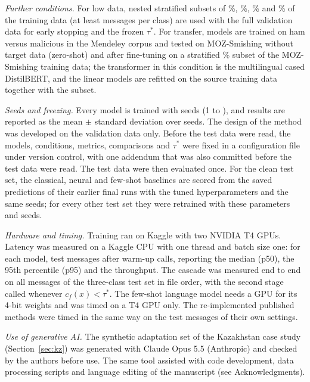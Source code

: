 \emph{Further conditions.} For low data, nested stratified subsets of \%, \%, \% and \% of the training data (at least  messages per class) are used with the full validation data for early stopping and the frozen $\tau^{*}$. For transfer, models are trained on ham versus malicious in the Mendeley corpus and tested on MOZ-Smishing without target data (zero-shot) and after fine-tuning on a stratified \% subset of the MOZ-Smishing training data; the transformer in this condition is the multilingual cased DistilBERT, and the linear models are refitted on the source training data together with the subset.

\emph{Seeds and freezing.} Every model is trained with  seeds (1 to ), and results are reported as the mean $\pm$ standard deviation over seeds. The design of the method was developed on the validation data only. Before the test data were read, the models, conditions, metrics, comparisons and $\tau^{*}$ were fixed in a configuration file under version control, with one addendum that was also committed before the test data were read. The test data were then evaluated once. For the clean test set, the classical, neural and few-shot baselines are scored from the saved predictions of their earlier final runs with the tuned hyperparameters and the same seeds; for every other test set they were retrained with these parameters and seeds.

\emph{Hardware and timing.} Training ran on Kaggle with two NVIDIA T4 GPUs. Latency was measured on a Kaggle CPU with one thread and batch size one: for each model,  test messages after  warm-up calls, reporting the median (p50), the 95th percentile (p95) and the throughput. The cascade was measured end to end on all  messages of the three-class test set in file order, with the second stage called whenever $c_f(x)<\tau^{*}$. The few-shot language model needs a GPU for its 4-bit weights and was timed on a T4 GPU only. The re-implemented published methods were timed in the same way on the test messages of their own settings.

\emph{Use of generative AI.} The synthetic adaptation set of the Kazakhstan case study (Section~\ref{sec:kz}) was generated with Claude Opus 5.5 (Anthropic) and checked by the authors before use. The same tool assisted with code development, data processing scripts and language editing of the manuscript (see Acknowledgments).

